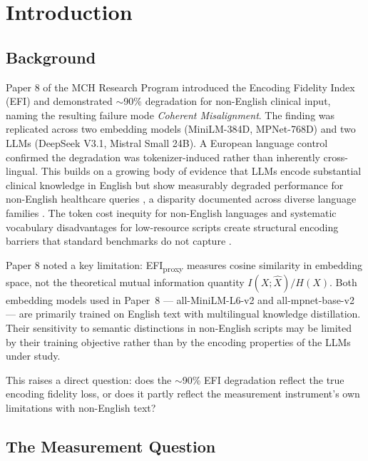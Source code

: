 \documentclass[11pt,a4paper]{article}
\begin{document}
\section{Introduction}

\subsection{Background}

Paper 8 of the MCH Research Program \citep{laxman2026h} introduced the Encoding Fidelity
Index (EFI) and demonstrated $\sim$90\% degradation for non-English clinical input, naming
the resulting failure mode \emph{Coherent Misalignment}. The finding was replicated across
two embedding models (MiniLM-384D, MPNet-768D) and two LLMs (DeepSeek V3.1, Mistral Small
24B). A European language control confirmed the degradation was tokenizer-induced rather
than inherently cross-lingual. This builds on a growing body of evidence that LLMs encode
substantial clinical knowledge in English \citep{singhal2023} but show measurably degraded
performance for non-English healthcare queries \citep{jin2024}, a disparity documented
across diverse language families \citep{blasi2022}. The token cost inequity for non-English
languages \citep{ahia2023} and systematic vocabulary disadvantages for low-resource scripts
\citep{limisiewicz2023} create structural encoding barriers that standard benchmarks do not
capture \citep{ruder2023}.

Paper 8 noted a key limitation: EFI\textsubscript{proxy} measures cosine similarity in
embedding space, not the theoretical mutual information quantity $I(X;\hat{X})/H(X)$. Both
embedding models used in Paper~8 --- all-MiniLM-L6-v2 and all-mpnet-base-v2 --- are
primarily trained on English text with multilingual knowledge distillation. Their
sensitivity to semantic distinctions in non-English scripts may be limited by their
training objective rather than by the encoding properties of the LLMs under study.

This raises a direct question: does the $\sim$90\% EFI degradation reflect the true
encoding fidelity loss, or does it partly reflect the measurement instrument's own
limitations with non-English text?

\subsection{The Measurement Question}
\end{document}
